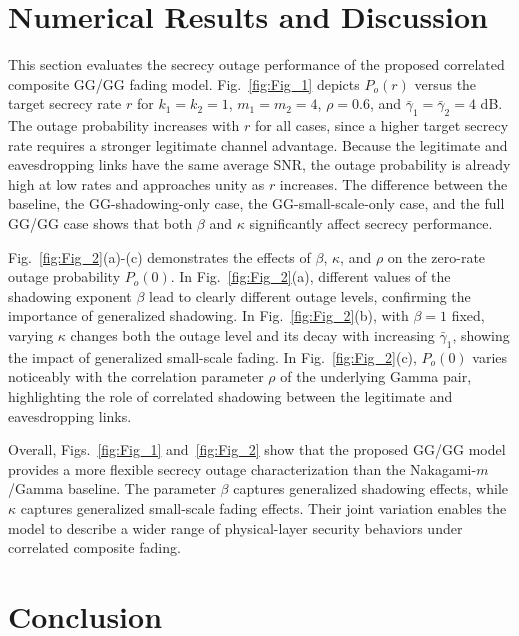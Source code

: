 \documentclass[lettersize,journal]{IEEEtran}
\begin{document}
\section{Numerical Results and Discussion}
\label{sec:numerical_results}

This section evaluates the secrecy outage performance of the proposed correlated composite GG/GG fading model. Fig.~\ref{fig:Fig_1} depicts $P_o(r)$ versus the target secrecy rate $r$ for $k_1=k_2=1$, $m_1=m_2=4$, $\rho=0.6$, and $\bar{\gamma}_1=\bar{\gamma}_2=4$ dB. The outage probability increases with $r$ for all cases, since a higher target secrecy rate requires a stronger legitimate channel advantage. Because the legitimate and eavesdropping links have the same average SNR, the outage probability is already high at low rates and approaches unity as $r$ increases. The difference between the baseline, the GG-shadowing-only case, the GG-small-scale-only case, and the full GG/GG case shows that both $\beta$ and $\kappa$ significantly affect secrecy performance.

Fig.~\ref{fig:Fig_2}(a)-(c) demonstrates the effects of $\beta$, $\kappa$, and $\rho$ on the zero-rate outage probability $P_o(0)$. In Fig.~\ref{fig:Fig_2}(a), different values of the shadowing exponent $\beta$ lead to clearly different outage levels, confirming the importance of generalized shadowing. In Fig.~\ref{fig:Fig_2}(b), with $\beta=1$ fixed, varying $\kappa$ changes both the outage level and its decay with increasing $\bar{\gamma}_1$, showing the impact of generalized small-scale fading. In Fig.~\ref{fig:Fig_2}(c), $P_o(0)$ varies noticeably with the correlation parameter $\rho$ of the underlying Gamma pair, highlighting the role of correlated shadowing between the legitimate and eavesdropping links. 

Overall, Figs.~\ref{fig:Fig_1} and~\ref{fig:Fig_2} show that the proposed GG/GG model provides a more flexible secrecy outage characterization than the Nakagami-$m$/Gamma baseline. The parameter $\beta$ captures generalized shadowing effects, while $\kappa$ captures generalized small-scale fading effects. Their joint variation enables the model to describe a wider range of physical-layer security behaviors under correlated composite fading.



\section{Conclusion}
\label{sec:conclusion}
\end{document}
